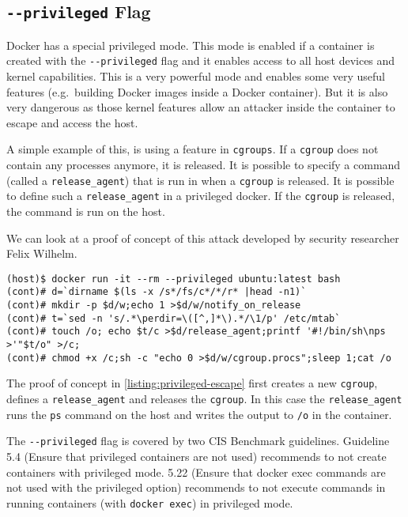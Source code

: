 \subsection{\texorpdfstring{\lstinline{--privileged}}{--privileged} Flag}\label{subsection:privileged}

Docker has a special privileged mode\cite{Docker-in-Docker-blog}. This mode is enabled if a container is created with the \lstinline{--privileged} flag and it enables access to all host devices and kernel capabilities. This is a very powerful mode and enables some very useful features (e.g.\ building Docker images inside a Docker container). But it is also very dangerous as those kernel features allow an attacker inside the container to escape and access the host.

\hfill

A simple example of this, is using a feature in \lstinline{cgroups}\cite{CGroup-Docs}. If a \lstinline{cgroup} does not contain any processes anymore, it is released. It is possible to specify a command (called a \lstinline{release_agent}) that is run in when a \lstinline{cgroup} is released. It is possible to define such a \lstinline{release_agent} in a privileged docker. If the \lstinline{cgroup} is released, the command is run on the host\cite{TrailOfBits-Docker-Escape}.

\hfill

We can look at a proof of concept of this attack developed by security researcher Felix Wilhelm\cite{Felix-Wilhem-Tweet}.
\begin{lstlisting}[caption={Privileged container escape using \lstinline{cgroups}.},captionpos=b,label={listing:privileged-escape}]
(host)$ docker run -it --rm --privileged ubuntu:latest bash
(cont)# d=`dirname $(ls -x /s*/fs/c*/*/r* |head -n1)`
(cont)# mkdir -p $d/w;echo 1 >$d/w/notify_on_release
(cont)# t=`sed -n 's/.*\perdir=\([^,]*\).*/\1/p' /etc/mtab`
(cont)# touch /o; echo $t/c >$d/release_agent;printf '#!/bin/sh\nps >'"$t/o" >/c;
(cont)# chmod +x /c;sh -c "echo 0 >$d/w/cgroup.procs";sleep 1;cat /o
\end{lstlisting}

The proof of concept in \autoref{listing:privileged-escape} first creates a new \lstinline{cgroup}, defines a \lstinline{release_agent} and releases the \lstinline{cgroup}. In this case the \lstinline{release_agent} runs the \lstinline{ps} command on the host and writes the output to \lstinline{/o} in the container.

\hfill

The \lstinline{--privileged} flag is covered by two CIS Benchmark guidelines. Guideline 5.4 (Ensure that privileged containers are not used) recommends to not create containers with privileged mode. 5.22 (Ensure that docker exec commands are not used with the privileged option) recommends to not execute commands in running containers (with \lstinline{docker exec}) in privileged mode.
